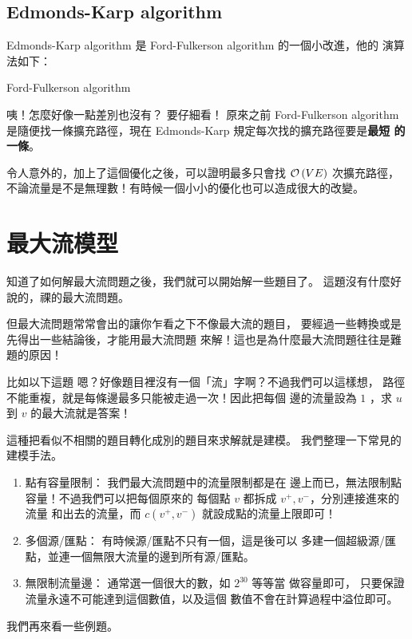 \documentclass[a4paper,12pt]{book}
\begin{document}
\subsection{Edmonds-Karp algorithm}
Edmonds-Karp algorithm 是 Ford-Fulkerson algorithm 的一個小改進，他的
演算法如下：

\begin{algorithm}[H]
  \DontPrintSemicolon
  \caption{Ford-Fulkerson algorithm}\label{euclid}
  \myalg{\FF{}} {
}
\end{algorithm}
咦！怎麼好像一點差別也沒有？ 要仔細看！ 原來之前 Ford-Fulkerson algorithm
是隨便找一條擴充路徑，現在 Edmonds-Karp 規定每次找的擴充路徑要是{\bf 最短
  的一條}。

令人意外的，加上了這個優化之後，可以證明最多只會找 $\operatorname{\mathcal{O}}\left(VE\right)$ 次擴充路徑，
不論流量是不是無理數！有時候一個小小的優化也可以造成很大的改變。

\section{最大流模型}
知道了如何解最大流問題之後，我們就可以開始解一些題目了。
這題沒有什麼好說的，祼的最大流問題。 

但最大流問題常常會出的讓你乍看之下不像最大流的題目，
要經過一些轉換或是先得出一些結論後，才能用最大流問題
來解！這也是為什麼最大流問題往往是難題的原因！

比如以下這題
嗯？好像題目裡沒有一個「流」字啊？不過我們可以這樣想，
路徑不能重複，就是每條邊最多只能被走過一次！因此把每個
邊的流量設為 $1$ ，求 $u$ 到 $v$ 的最大流就是答案！

這種把看似不相關的題目轉化成別的題目來求解就是建模。
我們整理一下常見的建模手法。
\begin{enumerate}
  \item 點有容量限制： 我們最大流問題中的流量限制都是在
    邊上而已，無法限制點容量！不過我們可以把每個原來的
    每個點 $v$ 都拆成 $v^+, v^-$，分別連接進來的流量
    和出去的流量，而 $c(v^+, v^-)$ 就設成點的流量上限即可！

  \item 多個源/匯點： 有時候源/匯點不只有一個，這是後可以
    多建一個超級源/匯點，並連一個無限大流量的邊到所有源/匯點。

  \item 無限制流量邊： 通常選一個很大的數，如 $2^{30}$ 等等當
    做容量即可， 只要保證流量永遠不可能達到這個數值，以及這個
    數值不會在計算過程中溢位即可。
\end{enumerate}
我們再來看一些例題。
\end{document}

